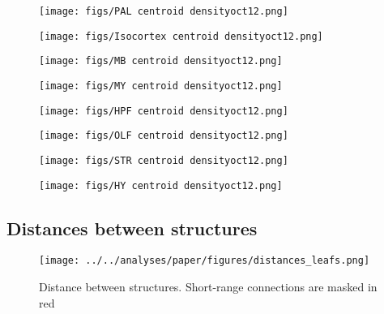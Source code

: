 \begin{figure}[H]
    \centering
    \texttt{[image: figs/PAL centroid densityoct12.png]} 
    \label{fig:my_label}
\end{figure}
\newpage

\begin{figure}[H]
    \centering
    \texttt{[image: figs/Isocortex centroid densityoct12.png]}
    \label{fig:iso_count}
\end{figure}
\newpage

\begin{figure}[H]
    \centering
    \texttt{[image: figs/MB centroid densityoct12.png]} 
    \label{fig:my_label}
\end{figure}
\newpage

\begin{figure}[H]
    \centering
    \texttt{[image: figs/MY centroid densityoct12.png]} 
    \label{fig:my_label}
\end{figure}
\newpage

\begin{figure}[H]
    \centering
    \texttt{[image: figs/HPF centroid densityoct12.png]} 
    \label{fig:my_label}
\end{figure}
\newpage

\begin{figure}[H]
    \centering
    \texttt{[image: figs/OLF centroid densityoct12.png]} 
    \label{fig:my_label}
\end{figure}
\newpage

\begin{figure}[H]
    \centering
    \texttt{[image: figs/STR centroid densityoct12.png]} 
    \label{fig:my_label}
\end{figure}
\newpage

\begin{figure}[H]
    \centering
    \texttt{[image: figs/HY centroid densityoct12.png]} 
    \label{fig:my_label}
\end{figure}

\newpage

\subsection{Distances between structures}

\begin{figure}[H]
    \centering
    \texttt{[image: ../../analyses/paper/figures/distances\_leafs.png]} 
    \caption{Distance between structures.  Short-range connections are masked in red}
    \label{fig:dist_bw_str}
\end{figure}

